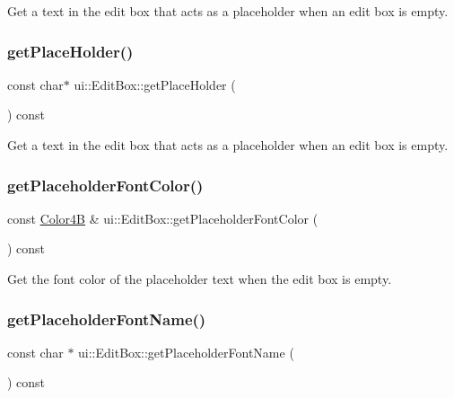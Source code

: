Get a text in the edit box that acts as a placeholder when an edit box is empty. \mbox{\label{classui_1_1EditBox_aadbd55732eaedc4bc678f8c25395319a}} 
\subsubsection{\texorpdfstring{get\+Place\+Holder()}{getPlaceHolder()}\hspace{0.1cm}{\footnotesize\ttfamily [2/2]}}
{\footnotesize\ttfamily const char$\ast$ ui\+::\+Edit\+Box\+::get\+Place\+Holder (\begin{DoxyParamCaption}{ }\end{DoxyParamCaption}) const}

Get a text in the edit box that acts as a placeholder when an edit box is empty. \mbox{\label{classui_1_1EditBox_a267922ed1ab9d6eb1192987584983e70}} 
\subsubsection{\texorpdfstring{get\+Placeholder\+Font\+Color()}{getPlaceholderFontColor()}}
{\footnotesize\ttfamily const \hyperlink{structColor4B}{Color4B} \& ui\+::\+Edit\+Box\+::get\+Placeholder\+Font\+Color (\begin{DoxyParamCaption}{ }\end{DoxyParamCaption}) const}

Get the font color of the placeholder text when the edit box is empty. \mbox{\label{classui_1_1EditBox_a10aa107d97c44e21733615e777e2ba4c}} 
\subsubsection{\texorpdfstring{get\+Placeholder\+Font\+Name()}{getPlaceholderFontName()}}
{\footnotesize\ttfamily const char $\ast$ ui\+::\+Edit\+Box\+::get\+Placeholder\+Font\+Name (\begin{DoxyParamCaption}{ }\end{DoxyParamCaption}) const}

